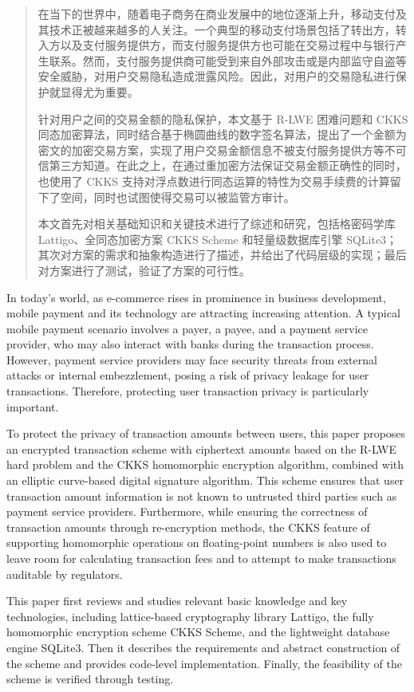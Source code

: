 \begin{abstract}
在当下的世界中，随着电子商务在商业发展中的地位逐渐上升，移动支付及其技术正被越来越多的人关注。一个典型的移动支付场景包括了转出方，转入方以及支付服务提供方，而支付服务提供方也可能在交易过程中与银行产生联系。然而，支付服务提供商可能受到来自外部攻击或是内部监守自盗等安全威胁，对用户交易隐私造成泄露风险。因此，对用户的交易隐私进行保护就显得尤为重要。

针对用户之间的交易金额的隐私保护，本文基于 R-LWE 困难问题和 CKKS 同态加密算法，同时结合基于椭圆曲线的数字签名算法，提出了一个金额为密文的加密交易方案，实现了用户交易金额信息不被支付服务提供方等不可信第三方知道。在此之上，在通过重加密方法保证交易金额正确性的同时，也使用了 CKKS 支持对浮点数进行同态运算的特性为交易手续费的计算留下了空间，同时也试图使得交易可以被监管方审计。

本文首先对相关基础知识和关键技术进行了综述和研究，包括格密码学库 Lattigo、全同态加密方案 CKKS Scheme 和轻量级数据库引擎 SQLite3；其次对方案的需求和抽象构造进行了描述，并给出了代码层级的实现；最后对方案进行了测试，验证了方案的可行性。

\end{abstract}

\begin{enabstract}
In today’s world, as e-commerce rises in prominence in business development, mobile payment and its technology are attracting increasing attention. A typical mobile payment scenario involves a payer, a payee, and a payment service provider, who may also interact with banks during the transaction process. However, payment service providers may face security threats from external attacks or internal embezzlement, posing a risk of privacy leakage for user transactions. Therefore, protecting user transaction privacy is particularly important.

To protect the privacy of transaction amounts between users, this paper proposes an encrypted transaction scheme with ciphertext amounts based on the R-LWE hard problem and the CKKS homomorphic encryption algorithm, combined with an elliptic curve-based digital signature algorithm. This scheme ensures that user transaction amount information is not known to untrusted third parties such as payment service providers. Furthermore, while ensuring the correctness of transaction amounts through re-encryption methods, the CKKS feature of supporting homomorphic operations on floating-point numbers is also used to leave room for calculating transaction fees and to attempt to make transactions auditable by regulators.
    
This paper first reviews and studies relevant basic knowledge and key technologies, including lattice-based cryptography library Lattigo, the fully homomorphic encryption scheme CKKS Scheme, and the lightweight database engine SQLite3. Then it describes the requirements and abstract construction of the scheme and provides code-level implementation. Finally, the feasibility of the scheme is verified through testing.
\end{enabstract}
